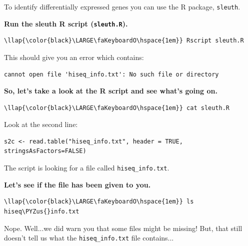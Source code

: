 \documentclass[11pt]{article}
\def\PYZus{\char`\_}
\begin{document}
To identify differentially expressed genes you can use the R package,
\texttt{sleuth}.

\textbf{Run the sleuth R script (\texttt{sleuth.R}).}

\begin{terminalinput}
\begin{Verbatim}[commandchars=\\\{\}]
\llap{\color{black}\LARGE\faKeyboardO\hspace{1em}} Rscript sleuth.R
\end{Verbatim}
\end{terminalinput}


    This should give you an error which contains:

\begin{verbatim}
cannot open file 'hiseq_info.txt': No such file or directory
\end{verbatim}

\newpage

\textbf{So, let's take a look at the R script and see what's going on.}

\begin{terminalinput}
\begin{Verbatim}[commandchars=\\\{\}]
\llap{\color{black}\LARGE\faKeyboardO\hspace{1em}} cat sleuth.R
\end{Verbatim}
\end{terminalinput}


    Look at the second line:

\begin{verbatim}
s2c <- read.table("hiseq_info.txt", header = TRUE, stringsAsFactors=FALSE)
\end{verbatim}

The script is looking for a file called \texttt{hiseq\_info.txt}.

\textbf{Let's see if the file has been given to you.}

\begin{terminalinput}
\begin{Verbatim}[commandchars=\\\{\}]
\llap{\color{black}\LARGE\faKeyboardO\hspace{1em}} ls hiseq\PYZus{}info.txt
\end{Verbatim}
\end{terminalinput}


    Nope. Well...we did warn you that some files might be missing! But, that
still doesn't tell us what the \texttt{hiseq\_info.txt} file contains...
\end{document}
